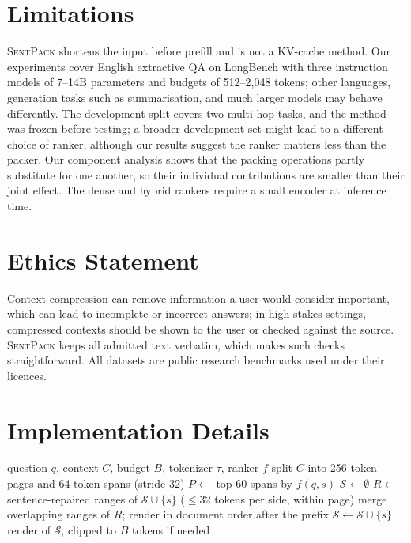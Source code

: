 \documentclass[11pt]{article}
\newcommand{\spk}{\textsc{SentPack}}
\begin{document}
\section*{Limitations}
\spk{} shortens the input before prefill and is not a KV-cache method. Our experiments cover English extractive QA on LongBench with three instruction models of 7--14B parameters and budgets of 512--2,048 tokens; other languages, generation tasks such as summarisation, and much larger models may behave differently. The development split covers two multi-hop tasks, and the method was frozen before testing; a broader development set might lead to a different choice of ranker, although our results suggest the ranker matters less than the packer. Our component analysis shows that the packing operations partly substitute for one another, so their individual contributions are smaller than their joint effect. The dense and hybrid rankers require a small encoder at inference time.

\section*{Ethics Statement}
Context compression can remove information a user would consider important, which can lead to incomplete or incorrect answers; in high-stakes settings, compressed contexts should be shown to the user or checked against the source. \spk{} keeps all admitted text verbatim, which makes such checks straightforward. All datasets are public research benchmarks used under their licences.



\appendix

\section{Implementation Details}
\label{app:impl}

\begin{algorithm}[h]
\caption{\spk{}}
\label{alg:sp}
\small
\begin{algorithmic}[1]
\Require question $q$, context $C$, budget $B$, tokenizer $\tau$, ranker $f$
\State split $C$ into 256-token pages and 64-token spans (stride 32)
\State $P\gets$ top 60 spans by $f(q,s)$
\State $\mathcal S\gets\emptyset$
  \State $R\gets$ sentence-repaired ranges of $\mathcal S\cup\{s\}$ ($\le$32 tokens per side, within page)
  \State merge overlapping ranges of $R$; render in document order after the prefix
   $\mathcal S\gets\mathcal S\cup\{s\}$ \EndIf
\EndFor
\State \Return render of $\mathcal S$, clipped to $B$ tokens if needed
\end{algorithmic}
\end{algorithm}
\end{document}
